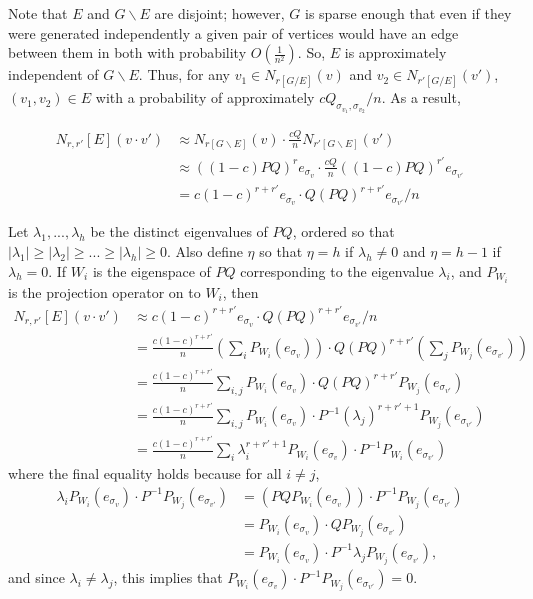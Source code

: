 \documentclass[11pt]{article}
\newcommand{\1}{\mathbb{1}}
\begin{document}
Note that $E$ and $G\backslash E$ are disjoint; however, $G$ is sparse enough that even if they were generated independently a given pair of vertices would have an edge between them in both with probability $O(\frac{1}{n^2})$. So, $E$ is approximately independent of $G\backslash E$. Thus, for any $v_1\in N_{r[G/E]}(v)$ and $v_2\in N_{r'[G/E]}(v')$, $(v_1,v_2)\in E$ with a probability of approximately $cQ_{\sigma_{v_1},\sigma_{v_2}}/n$. As a result,

\begin{align*}
N_{r,r'}[E](v\cdot v')&\approx N_{r[G\backslash E]}(v)\cdot \frac{cQ}{n} N_{r'[G\backslash E]}(v')\\
&\approx ((1-c)PQ)^re_{\sigma_v}\cdot \frac{cQ}{n} ((1-c)PQ)^{r'}e_{\sigma_{v'}}\\
&=c(1-c)^{r+r'}e_{\sigma_v}\cdot Q(PQ)^{r+r'}e_{\sigma_{v'}}/n
\end{align*}

 Let $\lambda_1,...,\lambda_h$ be the distinct eigenvalues of $PQ$, ordered so that $|\lambda_1|\ge|\lambda_2|\ge...\ge|\lambda_h|\ge 0$. Also define $\eta$ so that $\eta=h$ if $\lambda_h\ne 0$ and $\eta=h-1$ if $\lambda_h=0$. If $W_i$ is the eigenspace of $PQ$ corresponding to the eigenvalue $\lambda_i$, and $P_{W_i}$ is the projection operator on to $W_i$, then 
\begin{align*}
N_{r,r'}[E](v\cdot v')&\approx c(1-c)^{r+r'}e_{\sigma_v}\cdot Q(PQ)^{r+r'}e_{\sigma_{v'}}/n\\
&=\frac{c(1-c)^{r+r'}}{n} \left(\sum_i P_{W_i}(e_{\sigma_v})\right)\cdot Q(PQ)^{r+r'}\left(\sum_j P_{W_j}(e_{\sigma_{v'}})\right)\\
&=\frac{c(1-c)^{r+r'}}{n} \sum_{i,j}P_{W_i}(e_{\sigma_v})\cdot Q(PQ)^{r+r'}P_{W_j}(e_{\sigma_{v'}})\\
&=\frac{c(1-c)^{r+r'}}{n} \sum_{i,j}P_{W_i}(e_{\sigma_v})\cdot P^{-1}(\lambda_j)^{r+r'+1}P_{W_j}(e_{\sigma_{v'}})\\
&=\frac{c(1-c)^{r+r'}}{n} \sum_{i}\lambda_i^{r+r'+1} P_{W_i}(e_{\sigma_v})\cdot P^{-1}P_{W_i}(e_{\sigma_{v'}})
\end{align*}
where the final equality holds because for all $i\ne j$, 
\begin{align*}
\lambda_i  P_{W_i}(e_{\sigma_v})\cdot P^{-1} P_{W_j}(e_{\sigma_{v'}})&=(PQ  P_{W_i}(e_{\sigma_v}))\cdot P^{-1} P_{W_j}(e_{\sigma_{v'}})\\
&= P_{W_i}(e_{\sigma_v})\cdot Q P_{W_j}(e_{\sigma_{v'}})\\
&= P_{W_i}(e_{\sigma_v})\cdot P^{-1} \lambda_j P_{W_j}(e_{\sigma_{v'}}),
\end{align*}
and since $\lambda_i\ne \lambda_j$, this implies that $P_{W_i}(e_{\sigma_v})\cdot P^{-1} P_{W_j}(e_{\sigma_{v'}})=0$.
\end{document}
